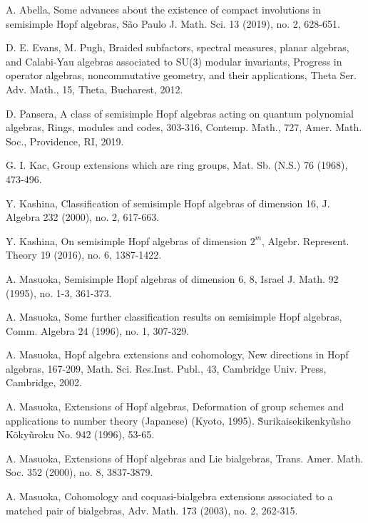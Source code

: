 \documentclass[a4paper,11pt]{amsart}
\numberwithin{equation}{section}
\begin{document}
\begin{thebibliography}{99}
 A. Abella, Some advances about the existence of compact involutions in semisimple Hopf algebras, S\~{a}o Paulo J. Math. Sci. 13 (2019), no. 2, 628-651.

 D. E. Evans, M. Pugh, Braided subfactors, spectral measures, planar algebras, and Calabi-Yau algebras associated to SU(3) modular invariants, Progress in operator algebras, noncommutative geometry, and their applications, Theta Ser. Adv. Math., 15, Theta, Bucharest, 2012.

 D. Pansera, A class of semisimple Hopf algebras acting on quantum polynomial algebras, Rings, modules and codes, 303-316, Contemp. Math., 727, Amer. Math. Soc.,
Providence, RI, 2019.


 G. I. Kac, Group extensions which are ring groups, Mat. Sb. (N.S.) 76 (1968), 473-496.

 Y. Kashina, Classification of semisimple Hopf algebras of dimension 16, J. Algebra 232 (2000), no. 2, 617-663.

 Y. Kashina, On semisimple Hopf algebras of dimension $2^m$, Algebr. Represent. Theory 19 (2016), no. 6, 1387-1422.


 A. Masuoka, Semisimple Hopf algebras of dimension 6, 8, Israel J. Math. 92 (1995), no. 1-3, 361-373.

 A. Masuoka, Some further classification results on semisimple Hopf algebras, Comm. Algebra 24 (1996), no. 1, 307-329.

 A. Masuoka, Hopf algebra extensions and cohomology, New directions in Hopf algebras, 167-209, Math. Sci. Res.Inst. Publ., 43, Cambridge
Univ. Press, Cambridge, 2002.

 A. Masuoka, Extensions of Hopf algebras, Deformation of group schemes and applications to number theory (Japanese) (Kyoto,
1995).
\~{S}urikaisekikenky\~{u}sho K\~{o}ky\~{u}roku No. 942 (1996), 53-65.


 A. Masuoka, Extensions of Hopf algebras and Lie bialgebras, Trans. Amer. Math. Soc. 352 (2000), no. 8, 3837-3879.

 A. Masuoka, Cohomology and coquasi-bialgebra extensions associated to a matched pair of bialgebras, Adv. Math. 173 (2003), no. 2, 262-315.


\end{thebibliography}
\end{document}

